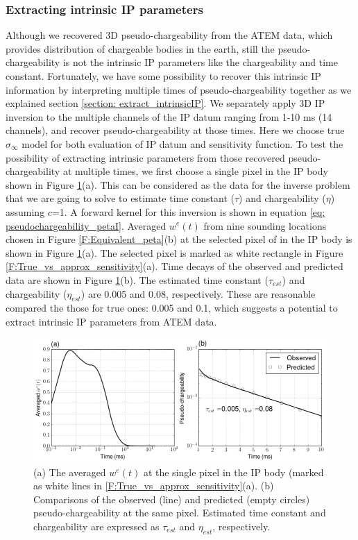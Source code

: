 \documentclass[a4paper, 11pt]{article}
\newcommand{\siginf}{\sigma_\infty}
\begin{document}
\subsubsection{Extracting intrinsic IP parameters}
Although we recovered 3D pseudo-chargeability from the ATEM data, which provides distribution of chargeable bodies in the earth, still the pseudo-chargeability is not the intrinsic IP  parameters like the chargeability and time constant.
Fortunately, we have some possibility to recover this intrinsic IP information by interpreting multiple times of pseudo-chargeability together as we explained section \ref{section: extract_intrinsicIP}. 
We separately apply 3D IP inversion to the multiple channels of the IP datum ranging from 1-10 ms (14 channels), and recover pseudo-chargeability at those times. 
Here we choose true $\siginf$ model for both evaluation of IP datum and sensitivity function. 
To test the possibility of extracting intrinsic parameters from those recovered pseudo-chargeability at multiple times, we first choose a single pixel in the IP body shown in Figure \ref{F:IntrinsicIP}(a).  
This can be considered as the data for the inverse problem that we are going to solve to  estimate time constant ($\tau$) and chargeability ($\eta$) assuming $c$=1. 
A forward kernel for this inversion is shown in equation \ref{eq: pseudochargeability_petaI}. 
Averaged $w^e(t)$ from nine sounding locations chosen in Figure \ref{F:Equivalent_peta}(b) at the selected pixel of in the IP body is shown in Figure \ref{F:IntrinsicIP}(a).
The selected pixel is marked as white rectangle in Figure \ref{F:True_vs_approx_sensitivity}(a).  
Time decays of the observed and predicted data are shown in Figure \ref{F:IntrinsicIP}(b).
The estimated time constant ($\tau_{est}$) and chargeability ($\eta_{est}$) are 0.005 and 0.08, respectively. 
These are reasonable compared the those for true ones: 0.005 and 0.1, which suggests a potential to extract intrinsic IP parameters from ATEM data. 

\begin{figure}[htb]
  \centering
  \includegraphics[width=1.\textwidth]{figures/IntrinsicIP.png}
  \caption{(a) The averaged $w^e(t)$ at the single pixel in the IP body (marked as white lines in \ref{F:True_vs_approx_sensitivity}(a). 
  (b) Comparisons of the observed (line) and predicted (empty circles) pseudo-chargeability at the same pixel. Estimated time constant and chargeability are expressed as $\tau_{est}$ and $\eta_{est}$, respectively.}
  \label{F:IntrinsicIP}
\end{figure}
\clearpage
\end{document}
